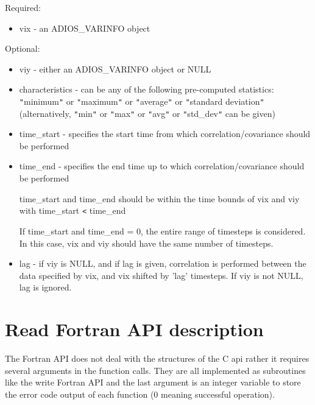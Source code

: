 Required:

\begin{itemize}
\item vix - an ADIOS\_VARINFO object
\end{itemize}

Optional:

\begin{itemize}
\item viy - either an ADIOS\_VARINFO object or NULL 

\item characteristics - can be any of the following pre-computed 
statistics: \texttt{"}minimum\texttt{"} or \texttt{"}maximum\texttt{"} or \texttt{"}average\texttt{"} 
or \texttt{"}standard deviation\texttt{"} (alternatively, \texttt{"}min\texttt{"} 
or \texttt{"}max\texttt{"} or \texttt{"}avg\texttt{"} or \texttt{"}std\_dev\texttt{"} 
can be given)

\item time\_start - specifies the start time from which correlation/covariance 
should be performed

\item time\_end - specifies the end time up to which correlation/covariance 
should be performed

time\_start and time\_end should be within the time bounds of vix and viy with 
time\_start \texttt{<} time\_end

If time\_start and time\_end = 0, the entire range of timesteps is considered. 
In this case, vix and viy should have the same number of timesteps.

\item lag - if viy is NULL, and if lag is given, correlation is performed 
between the data specified by vix, and vix shifted by 'lag' timesteps.  If viy 
is not NULL, lag is ignored.
\end{itemize}


\section{Read Fortran API description}
\label{section:read_fortran_api}

The Fortran API does not deal with the structures of the C api rather it requires 
several arguments in the function calls.  They are all implemented as subroutines 
like the write Fortran API and the last argument is an integer variable to store 
the error code output of each function (0 meaning successful operation). 

